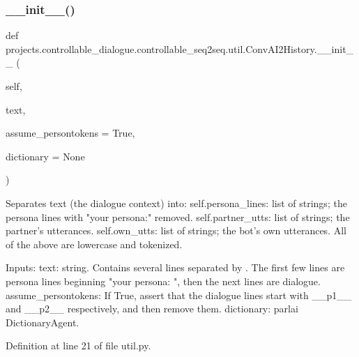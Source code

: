 \subsubsection{\texorpdfstring{\+\_\+\+\_\+init\+\_\+\+\_\+()}{\_\_init\_\_()}}
{\footnotesize\ttfamily def projects.\+controllable\+\_\+dialogue.\+controllable\+\_\+seq2seq.\+util.\+Conv\+A\+I2\+History.\+\_\+\+\_\+init\+\_\+\+\_\+ (\begin{DoxyParamCaption}\item[{}]{self,  }\item[{}]{text,  }\item[{}]{assume\+\_\+persontokens = {\ttfamily True},  }\item[{}]{dictionary = {\ttfamily None} }\end{DoxyParamCaption})}

\begin{DoxyVerb}Separates text (the dialogue context) into:
  self.persona_lines: list of strings; the persona lines with "your persona:"
    removed.
  self.partner_utts: list of strings; the partner's utterances.
  self.own_utts: list of strings; the bot's own utterances.
All of the above are lowercase and tokenized.

Inputs:
  text: string. Contains several lines separated by \n. The first few lines are
    persona lines beginning "your persona: ", then the next lines are dialogue.
  assume_persontokens: If True, assert that the dialogue lines start with
    __p1__ and __p2__ respectively, and then remove them.
  dictionary: parlai DictionaryAgent.
\end{DoxyVerb}
 

Definition at line 21 of file util.\+py.


